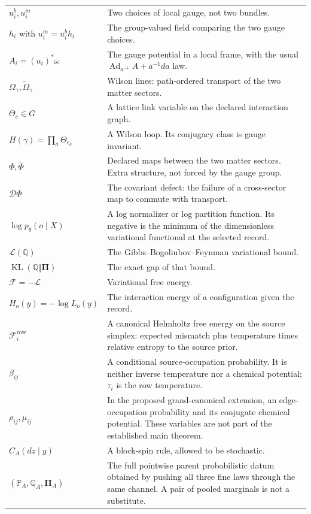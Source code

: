 \documentclass[11pt,letterpaper]{article}
\newcommand{\KL}{\operatorname{KL}}
\newcommand{\Prob}{\mathbb P}
\newcommand{\Rec}{\mathbb Q}
\newcommand{\Post}{\boldsymbol\Pi}
\newcommand{\Ad}{\operatorname{Ad}}
\begin{document}
{\begin{longtable}{>{\raggedright\arraybackslash}p{}>{\raggedright\arraybackslash}p{}}
\(u_i^b,u_i^m\) & Two choices of local gauge, not two bundles. \\
\(h_i\) with \(u_i^m=u_i^b h_i\) & The group-valued field comparing the two gauge choices. \\
\(A_i=(u_i)^*\omega\) & The gauge potential in a local frame, with the usual \(\Ad_{a^{-1}}A+a^{-1}da\) law. \\
\(\Omega_\gamma,\widetilde\Omega_\gamma\) & Wilson lines: path-ordered transport of the two matter sectors. \\
\(\Theta_e\in G\) & A lattice link variable on the declared interaction graph. \\
\(H(\gamma)=\prod_a\Theta_{e_a}\) & A Wilson loop. Its conjugacy class is gauge invariant. \\
\(\Phi,\widetilde\Phi\) & Declared maps between the two matter sectors. Extra structure, not forced by the gauge group. \\
\(\mathcal D\Phi\) & The covariant defect: the failure of a cross-sector map to commute with transport. \\
\(\log p_\theta(o\mid X)\) & A log normalizer or log partition function. Its negative is the minimum of the dimensionless variational functional at the selected record. \\
\(\mathcal L(\Rec)\) & The Gibbs--Bogoliubov--Feynman variational bound. \\
\(\KL(\Rec\Vert\Post)\) & The exact gap of that bound. \\
\(\mathcal F=-\mathcal L\) & Variational free energy. \\
\(H_o(y)=-\log L_o(y)\) & The interaction energy of a configuration given the record. \\
\(\mathcal F_i^{\mathrm{row}}\) & A canonical Helmholtz free energy on the source simplex: expected mismatch plus temperature times relative entropy to the source prior. \\
\(\beta_{ij}\) & A conditional source-occupation probability. It is neither inverse temperature nor a chemical potential; \(\tau_i\) is the row temperature. \\
\(\rho_{ij},\mu_{ij}\) & In the proposed grand-canonical extension, an edge-occupation probability and its conjugate chemical potential. These variables are not part of the established main theorem. \\
\(C_A(dz\mid y)\) & A block-spin rule, allowed to be stochastic. \\
\((\Prob_A,\Rec_A,\Post_A)\) & The full pointwise parent probabilistic datum obtained by pushing all three fine laws through the same channel. A pair of pooled marginals is not a substitute. \\

\end{longtable}}
\end{document}
